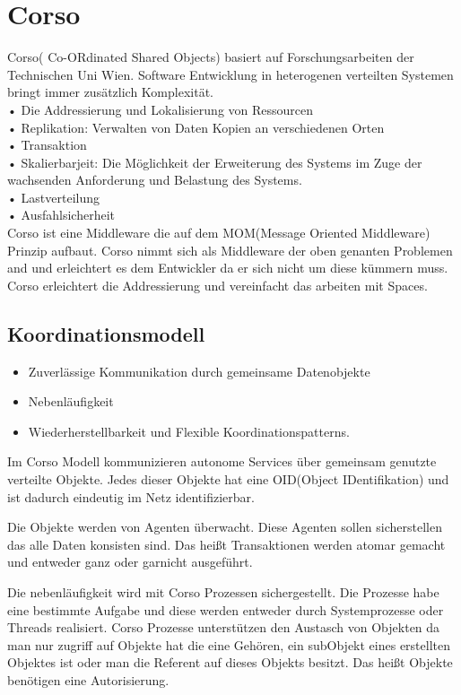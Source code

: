 \documentclass[a4paper,12pt]{scrreprt}
\begin{document}
		
		\section{Corso}
			Corso( Co-ORdinated Shared Objects) basiert auf Forschungsarbeiten der Technischen Uni Wien.
			Software Entwicklung in heterogenen verteilten Systemen bringt immer zusätzlich Komplexität.\\
			•	Die Addressierung und Lokalisierung von Ressourcen\\
			•	Replikation: Verwalten von Daten Kopien an verschiedenen Orten\\
			•	Transaktion\\
			•	Skalierbarjeit: Die Möglichkeit der Erweiterung des Systems im Zuge der wachsenden Anforderung und Belastung des Systems.\\
			•	Lastverteilung\\
			•	Ausfahlsicherheit\\
			Corso ist eine Middleware die auf dem MOM(Message Oriented Middleware) Prinzip aufbaut. Corso nimmt sich als Middleware der oben genanten Problemen and und erleichtert es dem Entwickler da er sich nicht um diese kümmern muss. Corso erleichtert die Addressierung und vereinfacht das arbeiten mit Spaces.\\
			
			\subsection{Koordinationsmodell}
			
			\begin{itemize}
			\item Zuverlässige Kommunikation durch gemeinsame Datenobjekte
			\item Nebenläufigkeit
			\item Wiederherstellbarkeit und Flexible Koordinationspatterns.
			\end{itemize}
			
			Im Corso Modell kommunizieren autonome Services über gemeinsam genutzte verteilte Objekte. Jedes dieser Objekte hat eine OID(Object IDentifikation) und ist dadurch eindeutig im Netz identifizierbar.
			
			Die Objekte werden von Agenten überwacht. Diese Agenten sollen sicherstellen das alle Daten konsisten sind. Das heißt Transaktionen werden atomar gemacht und entweder ganz oder garnicht ausgeführt.
			
			Die nebenläufigkeit wird mit Corso Prozessen sichergestellt. Die Prozesse habe eine bestimmte Aufgabe und diese werden entweder durch Systemprozesse oder Threads realisiert.
			Corso Prozesse unterstützen den Austasch von Objekten da man nur zugriff auf Objekte hat die eine Gehören, ein subObjekt eines erstellten Objektes ist oder man die Referent auf dieses Objekts besitzt.
			Das heißt Objekte benötigen eine Autorisierung.
			
\end{document}
